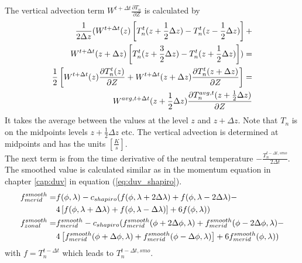 The vertical advection term $W^{t+\Delta t}\frac{\partial
T_n}{\partial Z}$ is calculated by
%
\begin{align}
  \frac{1}{2 \Delta z}( W^{t+\Delta t}(z)\left[ T_n^t(z+\frac{1}{2}
\Delta z) -
  T_n^t(z-\frac{1}{2}\Delta z) \right]+ \notag \\
       W^{t+\Delta t}(z+\Delta z)\left[ T_n^t(z+\frac{3}{2}\Delta z) -
       T_n^t(z+\frac{1}{2}\Delta z) \right] )
       = \notag \\
  \frac{1}{2} \left[ W^{t+\Delta t}(z) \frac{\partial T_n^t(z)}{\partial Z}+
                            W^{t+\Delta t}(z+\Delta z)\frac{\partial T_n^t(z+\Delta z)}{\partial Z}
                            \right] = \notag \\
          W^{avg, t+\Delta t}(z+\frac{1}{2}\Delta z)
          \frac{\partial T_n^{avg,t}(z+\frac{1}{2}\Delta z)}{\partial Z}
\end{align}
%
It takes the average between the values at the level $z$ and
$z+\Delta z$. Note that $T_n$ is on the midpoints levels
$z+\frac{1}{2}\Delta z$ etc. The vertical advection is determined at
midpoints and has the units $[\frac{K}{s}]$. \\
%
The next term is from the time derivative of the neutral temperature
$-\frac{T_n^{t- \Delta t,smo}}{2 \Delta t}$. The smoothed value is
calculated similar as in the momentum equation in chapter
\ref{cap:duv} in equation (\ref{eq:duv_shapiro}).
%
\begin{align}
  f^{smooth}_{merid} = & f(\phi,\lambda) - c_{shapiro} (  f(\phi,\lambda+2\Delta \lambda) +
  f(\phi,\lambda-2\Delta \lambda) - \notag \\
{} & 4 \left[ f(\phi,\lambda+\Delta \lambda) + f(\phi,\lambda-\Delta
\lambda) \right]+
  6 f(\phi,\lambda) ) \\
  f^{smooth}_{zonal} = & f^{smooth}_{merid} -c_{shapiro} (  f^{smooth}_{merid}(\phi+2 \Delta \phi,\lambda) +
  f^{smooth}_{merid}(\phi-2\Delta \phi,\lambda) - \notag \\
{} & 4 \left[ f^{smooth}_{merid}(\phi+\Delta \phi,\lambda)
  + f^{smooth}_{merid}(\phi-\Delta \phi,\lambda)  \right]+
  6 f^{smooth}_{merid}(\phi,\lambda) ) \label{eq:dt_shapiro}
\end{align}
%
with $f = T_n^{t-\Delta t}$ which leads to $T_n^{t-\Delta t,smo}$.
\\

